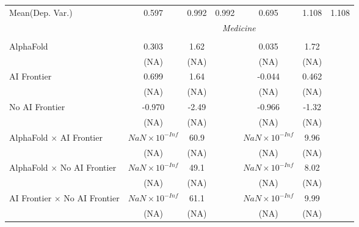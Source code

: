 \begin{tabular}{lcccccc}
Mean(Dep. Var.) & 0.597 & 0.992 & 0.992 & 0.695 & 1.108 & 1.108 \\
 & \multicolumn{6}{c}{\textit{Medicine}} \\ \\
   AlphaFold                                                                  & 0.303                  & 1.62  &        & 0.035                  & 1.72  &   \\   
                                                                              & (NA)                   & (NA)  &        & (NA)                   & (NA)  &   \\   
   AI Frontier                                                                & 0.699                  & 1.64  &        & -0.044                 & 0.462 &   \\   
                                                                              & (NA)                   & (NA)  &        & (NA)                   & (NA)  &   \\   
   No AI Frontier                                                             & -0.970                 & -2.49 &        & -0.966                 & -1.32 &   \\   
                                                                              & (NA)                   & (NA)  &        & (NA)                   & (NA)  &   \\   
   AlphaFold $\times$ AI Frontier                                             & $NaN\times 10^{-Inf}$  & 60.9  &        & $NaN\times 10^{-Inf}$  & 9.96  &   \\   
                                                                              & (NA)                   & (NA)  &        & (NA)                   & (NA)  &   \\   
   AlphaFold $\times$ No AI Frontier                                          & $NaN\times 10^{-Inf}$  & 49.1  &        & $NaN\times 10^{-Inf}$  & 8.02  &   \\   
                                                                              & (NA)                   & (NA)  &        & (NA)                   & (NA)  &   \\   
   AI Frontier $\times$ No AI Frontier                                        & $NaN\times 10^{-Inf}$  & 61.1  &        & $NaN\times 10^{-Inf}$  & 9.99  &   \\   
                                                                              & (NA)                   & (NA)  &        & (NA)                   & (NA)  &   \\   

\end{tabular}
